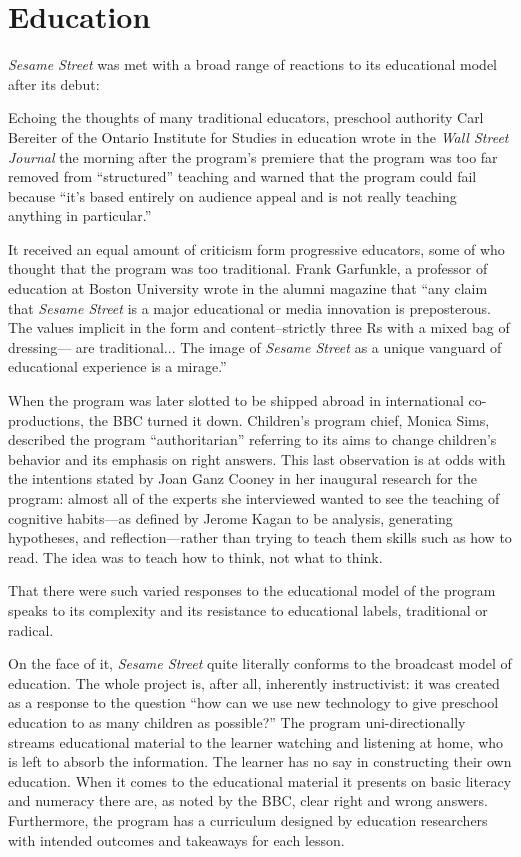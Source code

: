 \documentclass[12pt,letterpaper]{article}
\begin{document}
	\section*{Education}	


	\textit{Sesame Street} was met with a broad range of reactions to its 
	educational model after its debut: 

	Echoing the thoughts of many traditional educators, preschool authority
	Carl Bereiter of the Ontario Institute for Studies in education wrote in
	the \textit{Wall Street Journal} the morning after the program's 
	premiere that the program was too far removed from ``structured'' 
	teaching and warned that the program could fail because ``it's based 
	entirely on audience appeal and is not really teaching anything in 
	particular.''\autocite[200]{Davis}

	It received an equal amount of criticism form progressive educators, 
	some of who thought that the program was too traditional. Frank 
	Garfunkle, a professor of education at Boston University wrote in the 
	alumni magazine that ``any claim that \textit{Sesame Street} is a major 
	educational or media innovation is preposterous. The values implicit in
	the form and content--strictly three Rs with a mixed bag of dressing---	
	are traditional... The image of \textit{Sesame Street} as a unique 
	vanguard of educational experience is a mirage.''\autocite[201]{Davis}

	When the program was later slotted to be shipped abroad in 
	international co-productions, the BBC turned it down. Children's 
	program chief, Monica Sims, described the program ``authoritarian'' 
	referring to its aims to change children's behavior and its emphasis on 
	right answers.\autocite[211]{Davis} This last observation is at odds
	with the intentions stated by Joan Ganz Cooney in her inaugural
	research for the program: almost all of the experts she interviewed 
	wanted to see the teaching of cognitive habits---as defined by Jerome 
	Kagan to be analysis, generating hypotheses, and reflection---rather 
	than trying to teach them skills such as how to read. The idea was to
	teach how to think, not what to think.\autocite[23]{Cooney} 

	That there were such varied responses to the educational model of the
	program speaks to its complexity and its resistance to educational 
	labels, traditional or radical.   

	On the face of it, \textit{Sesame Street} quite literally conforms to 
	the broadcast model of education. The whole project is, after all, 
	inherently instructivist: it was created as a response to the question
	``how can we use new technology to give preschool education to as many 
	children as possible?'' The program 
	uni-directionally streams educational material to the learner watching 
	and listening at home, who is left to absorb the information. The 
	learner has no say in constructing their own education. When it comes to
	the educational material it presents on basic literacy and numeracy 
	there are, as noted by the BBC, clear right and wrong answers. 
	Furthermore, the program has a curriculum 
	designed by education researchers with intended outcomes and takeaways 
	for each lesson.\autocite[117]{Davis} 
\end{document}
